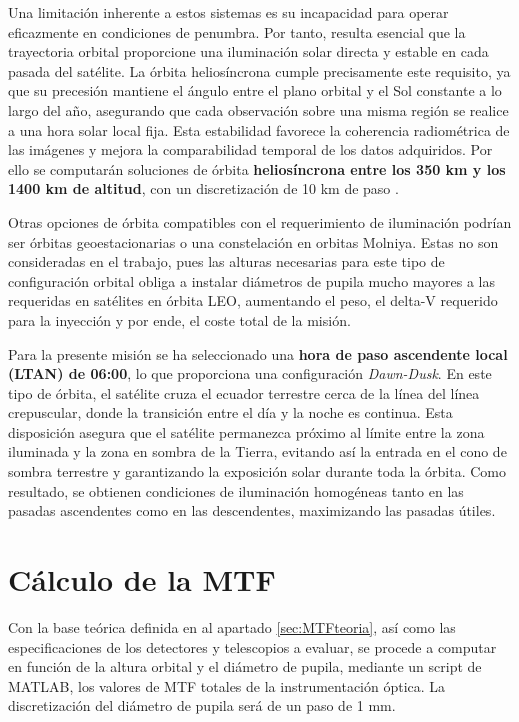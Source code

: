 Una limitación inherente a estos sistemas es su incapacidad para operar eficazmente en condiciones de penumbra. Por tanto, resulta esencial que la trayectoria orbital proporcione una iluminación solar directa y estable en cada pasada del satélite. La órbita heliosíncrona cumple precisamente este requisito, ya que su precesión mantiene el ángulo entre el plano orbital y el Sol constante a lo largo del año, asegurando que cada observación sobre una misma región se realice a una hora solar local fija. Esta estabilidad favorece la coherencia radiométrica de las imágenes y mejora la comparabilidad temporal de los datos adquiridos. Por ello se computarán soluciones de órbita \textbf{heliosíncrona entre los 350 km y los 1400 km de altitud}, con un discretización de 10 km de paso \cite{nasa_sso_slots_2011}.

Otras opciones de órbita compatibles con el requerimiento de iluminación podrían ser órbitas geoestacionarias o una constelación en orbitas Molniya. Estas no son consideradas en el trabajo, pues las alturas necesarias para este tipo de configuración orbital obliga a instalar diámetros de pupila mucho mayores a las requeridas en satélites en órbita LEO, aumentando el peso, el delta-V requerido para la inyección y por ende, el coste total de la misión.

Para la presente misión se ha seleccionado una \textbf{hora de paso ascendente local (LTAN) de 06:00}, lo que proporciona una configuración \textit{Dawn-Dusk}. En este tipo de órbita, el satélite cruza el ecuador terrestre cerca de la línea del línea crepuscular, donde la transición entre el día y la noche es continua. Esta disposición asegura que el satélite permanezca próximo al límite entre la zona iluminada y la zona en sombra de la Tierra, evitando así la entrada en el cono de sombra terrestre y garantizando la exposición solar durante toda la órbita. Como resultado, se obtienen condiciones de iluminación homogéneas tanto en las pasadas ascendentes como en las descendentes, maximizando las pasadas útiles\cite{Boain2004}.

\section{Cálculo de la MTF}

Con la base teórica definida en al apartado \ref{sec:MTFteoria}, así como las especificaciones de los detectores y telescopios a evaluar, se procede a computar en función de la altura orbital y el diámetro de pupila, mediante un script de MATLAB, los valores de MTF totales de la instrumentación óptica. La discretización del diámetro de pupila será de un paso de 1 mm.

